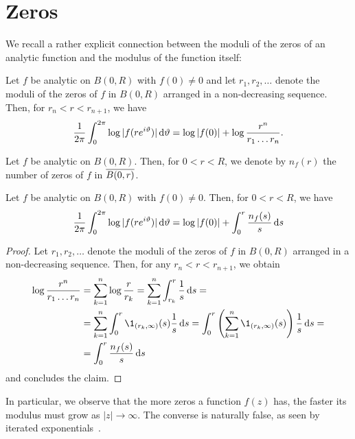 \section{Zeros}
\label{sec:zeros}

We recall a rather explicit connection between the moduli of the zeros of an analytic function and the modulus of the function itself:

\begin{theorem} \label{thm:jensen}
    Let $f$ be analytic on $B(0, R)$ with $f(0) \neq 0$ and let $r_1, r_2, \hdots$ denote the moduli of the zeros of $f$ in $B(0, R)$ arranged in a non-decreasing sequence. Then, for $r_n < r < r_{n+1}$, we have
    $$ \frac{1}{2 \pi} \int_0^{2\pi} \log \vert f(r e^{i \vartheta}) \vert \mathop{}\!\mathrm{d} \vartheta = \log \vert f(0) \vert + \log \frac{r^n}{r_1 \hdots r_n}. $$
\end{theorem}

\begin{definition}
    Let $f$ be analytic on $B(0, R)$. Then, for $0 < r < R$, we denote by $n_f(r)$ the number of zeros of $f$ in $\overline{B(0,r)}$.
\end{definition}

\begin{corollary}
    Let $f$ be analytic on $B(0, R)$ with $f(0) \neq 0$. Then, for $0 < r < R$, we have
    $$ \frac{1}{2 \pi} \int_0^{2\pi} \log \vert f(re^{i \vartheta}) \vert \mathop{}\!\mathrm{d} \vartheta = \log \vert f(0) \vert + \int_0^r \frac{n_f(s)}{s} \mathop{}\!\mathrm{d} s $$
\end{corollary}

\begin{proof}
    Let $r_1, r_2, \hdots$ denote the moduli of the zeros of $f$ in $B(0, R)$ arranged in a non-decreasing sequence. Then, for any $r_n < r < r_{n+1}$, we obtain
    \begin{align*}
        \log \frac{r^n}{r_1 \hdots r_n} &= \sum_{k=1}^n \log \frac{r}{r_k} = \sum_{k=1}^n \int_{r_k}^r \frac{1}{s} \diff s = \\
        &= \sum_{k=1}^n \int_0^r \1_{(r_k, \infty)}(s) \frac{1}{s} \diff s = \int_0^r \left( \sum_{k=1}^n \1_{(r_k, \infty)}(s) \right) \frac{1}{s} \diff s = \\
        &= \int_0^r \frac{n_f(s)}{s} \diff s
    \end{align*}
    and  concludes the claim.
\end{proof}

In particular, we observe that the more zeros a function $f(z)$ has, the faster its modulus must grow as $\vert z \vert \to \infty$. The converse is naturally false, as seen by iterated exponentials~\cite{segal-complex-analysis}.

